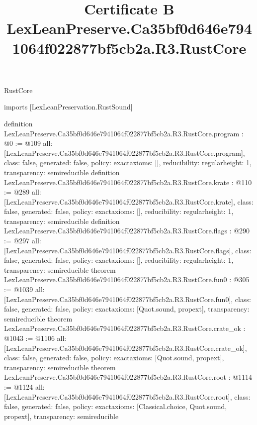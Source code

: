 \begin{lexlean}{RustCore}
\title{Certificate B LexLeanPreserve.Ca35bf0d646e7941064f022877bf5cb2a.R3.RustCore}
\begin{coremodule}
imports [LexLeanPreservation.RustSound]

definition LexLeanPreserve.Ca35bf0d646e7941064f022877bf5cb2a.R3.RustCore.program : @0 := @109 {
  all: [LexLeanPreserve.Ca35bf0d646e7941064f022877bf5cb2a.R3.RustCore.program],
  class: false,
  generated: false,
  policy: exact{axioms: []},
  reducibility: regular{height: 1},
  transparency: semireducible
}
definition LexLeanPreserve.Ca35bf0d646e7941064f022877bf5cb2a.R3.RustCore.krate : @110 := @289 {
  all: [LexLeanPreserve.Ca35bf0d646e7941064f022877bf5cb2a.R3.RustCore.krate],
  class: false,
  generated: false,
  policy: exact{axioms: []},
  reducibility: regular{height: 1},
  transparency: semireducible
}
definition LexLeanPreserve.Ca35bf0d646e7941064f022877bf5cb2a.R3.RustCore.flags : @290 := @297 {
  all: [LexLeanPreserve.Ca35bf0d646e7941064f022877bf5cb2a.R3.RustCore.flags],
  class: false,
  generated: false,
  policy: exact{axioms: []},
  reducibility: regular{height: 1},
  transparency: semireducible
}
theorem LexLeanPreserve.Ca35bf0d646e7941064f022877bf5cb2a.R3.RustCore.fun0 : @305 := @1039 {
  all: [LexLeanPreserve.Ca35bf0d646e7941064f022877bf5cb2a.R3.RustCore.fun0],
  class: false,
  generated: false,
  policy: exact{axioms: [Quot.sound, propext]},
  transparency: semireducible
}
theorem LexLeanPreserve.Ca35bf0d646e7941064f022877bf5cb2a.R3.RustCore.crate_ok : @1043 := @1106 {
  all: [LexLeanPreserve.Ca35bf0d646e7941064f022877bf5cb2a.R3.RustCore.crate_ok],
  class: false,
  generated: false,
  policy: exact{axioms: [Quot.sound, propext]},
  transparency: semireducible
}
theorem LexLeanPreserve.Ca35bf0d646e7941064f022877bf5cb2a.R3.RustCore.root : @1114 := @1124 {
  all: [LexLeanPreserve.Ca35bf0d646e7941064f022877bf5cb2a.R3.RustCore.root],
  class: false,
  generated: false,
  policy: exact{axioms: [Classical.choice, Quot.sound, propext]},
  transparency: semireducible
}


\end{coremodule}
\end{lexlean}
